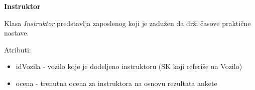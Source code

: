 \textbf{\large Instruktor}
\vspace{0.3cm}

Klasa \textit{Instruktor} predstavlja zaposlenog koji je zadužen da drži časove praktične nastave.

Atributi:
\begin{itemize}
    \item idVozila - vozilo koje je dodeljeno instruktoru (SK koji referiše na Vozilo)
    \item ocena - trenutna ocena za instruktora na osnovu rezultata ankete
\end{itemize}
